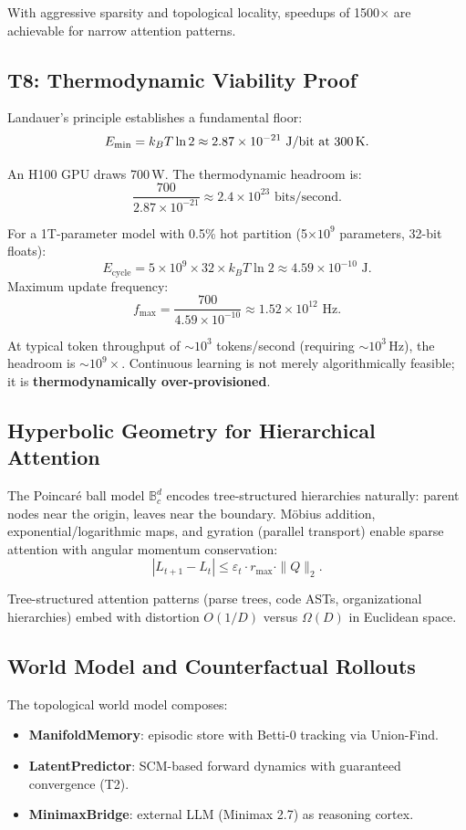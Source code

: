 \documentclass[11pt, a4paper]{article}
\theoremstyle{proofform}
\numberwithin{innerpoints}{subsection}
\numberwithin{disproof}{subsection}
\theoremstyle{mathproof}
\begin{document}
With aggressive sparsity and topological locality, speedups of 1500$\times$ are achievable for narrow attention patterns.

\subsection{T8: Thermodynamic Viability Proof}

Landauer's principle establishes a fundamental floor:
\[
E_{\min} = k_B T \ln 2 \approx 2.87 \times 10^{-21} \text{ J/bit at 300\,K.}
\]

An H100 GPU draws 700\,W. The thermodynamic headroom is:
\[
\frac{700}{2.87 \times 10^{-21}} \approx 2.4 \times 10^{23} \text{ bits/second}.
\]

For a 1T-parameter model with 0.5\% hot partition (5$\times$$10^9$ parameters, 32-bit floats):
\[
E_{\text{cycle}} = 5 \times 10^9 \times 32 \times k_B T \ln 2 \approx 4.59 \times 10^{-10} \text{ J.}
\]
Maximum update frequency:
\[
f_{\max} = \frac{700}{4.59 \times 10^{-10}} \approx 1.52 \times 10^{12} \text{ Hz.}
\]

At typical token throughput of $\sim$$10^3$ tokens/second (requiring $\sim$$10^3$\,Hz), the headroom is $\sim$$10^9\times$. Continuous learning is not merely algorithmically feasible; it is \textbf{thermodynamically over-provisioned}.

\subsection{Hyperbolic Geometry for Hierarchical Attention}

The Poincar\'e ball model $\mathbb{B}^d_c$ encodes tree-structured hierarchies naturally: parent nodes near the origin, leaves near the boundary. M\"{o}bius addition, exponential/logarithmic maps, and gyration (parallel transport) enable sparse attention with angular momentum conservation:
\[
|L_{t+1} - L_t| \leq \varepsilon_t \cdot r_{\max} \cdot \|Q\|_2.
\]

Tree-structured attention patterns (parse trees, code ASTs, organizational hierarchies) embed with distortion $O(1/D)$ versus $\Omega(D)$ in Euclidean space.

\subsection{World Model and Counterfactual Rollouts}

The topological world model composes:
\begin{itemize}[nosep]
  \item \textbf{ManifoldMemory}: episodic store with Betti-0 tracking via Union-Find.
  \item \textbf{LatentPredictor}: SCM-based forward dynamics with guaranteed convergence (T2).
  \item \textbf{MinimaxBridge}: external LLM (Minimax 2.7) as reasoning cortex.
\end{itemize}
\end{document}

